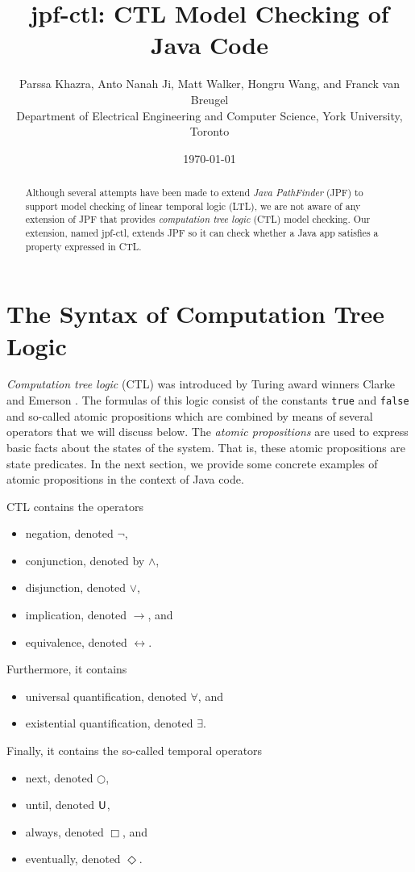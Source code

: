 \documentclass[12pt]{article}
\newcommand{\always}{\Box}
\newcommand{\eventually}{\Diamond}
\newcommand{\nxt}{\bigcirc}
\newcommand{\until}{\mathbin{\sf U}}
\theoremstyle{definition}
\begin{document}
\title{jpf-ctl: CTL Model Checking of Java Code}
\author{Parssa Khazra, Anto Nanah Ji, Matt Walker, Hongru Wang, and Franck van Breugel\\
Department of Electrical Engineering and Computer Science, York University, Toronto}
\date{\today}
\maketitle

\begin{abstract}
Although several attempts have been made to extend \emph{Java PathFinder} (JPF) to support model checking of linear temporal logic (LTL), we are not aware of any extension of JPF that provides \emph{computation tree logic} (CTL) model checking.  Our extension, named jpf-ctl, extends JPF so it can check whether a Java app satisfies a property expressed in CTL.
\end{abstract}

\section{The Syntax of Computation Tree Logic}

\emph{Computation tree logic} (CTL) was introduced by Turing award winners Clarke and Emerson \cite{CE81}.  The formulas of this logic consist of the constants \lstinline{true} and \lstinline{false} and so-called atomic propositions which are combined by means of several operators that we will discuss below.  The \emph{atomic propositions} are used to express basic facts about the states of the system.  That is, these atomic propositions are state predicates.  In the next section, we provide some concrete examples of atomic propositions in the context of Java code.

CTL contains the operators
\begin{itemize}
\item
negation, denoted $\neg$,
\item 
conjunction, denoted by $\wedge$,
\item
disjunction, denoted $\vee$,
\item
implication, denoted $\rightarrow$, and
\item
equivalence, denoted $\leftrightarrow$.
\end{itemize}
Furthermore, it contains
\begin{itemize}
\item 
universal quantification, denoted $\forall$, and
\item
existential quantification, denoted $\exists$.
\end{itemize}
Finally, it contains the so-called temporal operators
\begin{itemize}
\item 
next, denoted $\nxt$,
\item
until, denoted $\until$,
\item
always, denoted $\always$, and
\item
eventually, denoted $\eventually$.
\end{itemize}
\end{document}
